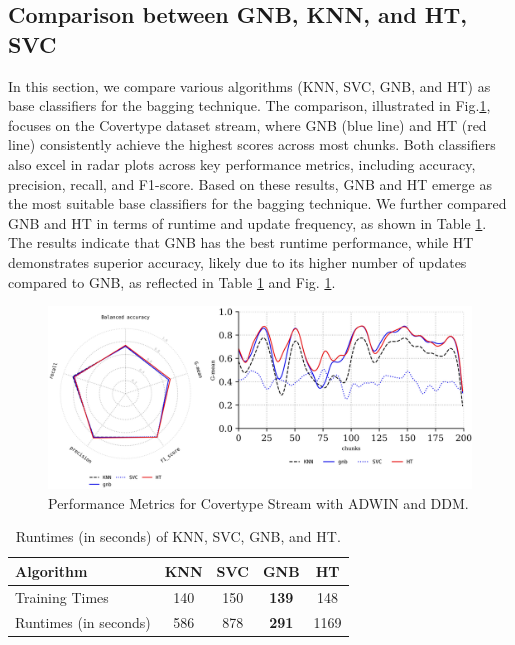 \subsection{Comparison between GNB, KNN, and HT, SVC}
\label{sec:compared_base_calssfier}
In this section, we compare various algorithms (KNN, SVC, GNB, and HT) as base classifiers for the bagging technique. The comparison, illustrated in Fig.\ref{fig:res4}, focuses on the Covertype dataset stream, where GNB (blue line) and HT (red line) consistently achieve the highest scores across most chunks. Both classifiers also excel in radar plots across key performance metrics, including accuracy, precision, recall, and F1-score. Based on these results, GNB and HT emerge as the most suitable base classifiers for the bagging technique. We further compared GNB and HT in terms of runtime and update frequency, as shown in Table \ref{table:table_3}. The results indicate that GNB has the best runtime performance, while HT demonstrates superior accuracy, likely due to its higher number of updates compared to GNB, as reflected in Table \ref{table:table_3} and Fig. \ref{fig:res4}.

\begin{figure}[t]
	\centering
	\includegraphics[width=1\linewidth]{5_Emerging/images/res4.png}
	\caption{Performance Metrics for Covertype Stream with ADWIN and DDM.}

	\label{fig:res4}
\end{figure}				

	
\begin{table}[t]
	\centering
	\caption{Runtimes (in seconds) of KNN, SVC, GNB, and HT.}
	\begin{tabular}{|l|c|c|c|c|}
	\hline
	\textbf{Algorithm}     & \textbf{KNN} & \textbf{SVC} & \textbf{GNB} & \textbf{HT} \\ \hline
		Training Times         & 140          & 150          & \textbf{139} & 148         \\ \hline
		Runtimes (in seconds)         & 586          & 878          & \textbf{291} & 1169        \\ \hline
	\end{tabular}
	\label{table:table_3}
	\end{table}



